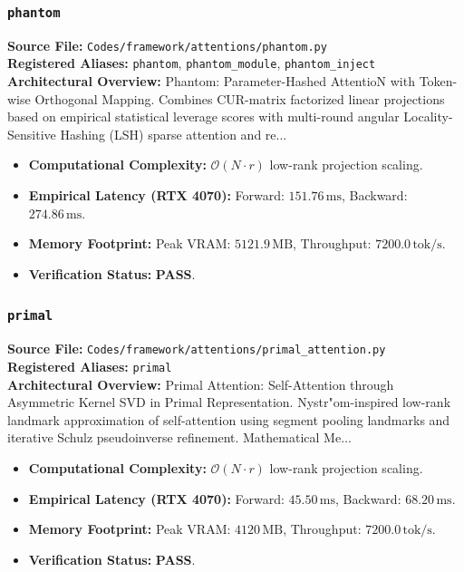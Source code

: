 \subsubsection{\texttt{phantom}}
\textbf{Source File:} \texttt{Codes/framework/attentions/phantom.py} \\
\textbf{Registered Aliases:} \texttt{phantom}, \texttt{phantom\_module}, \texttt{phantom\_inject} \\
\textbf{Architectural Overview:} Phantom: Parameter-Hashed AttentioN with Token-wise Orthogonal Mapping. Combines CUR-matrix factorized linear projections based on empirical statistical leverage scores with multi-round angular Locality-Sensitive Hashing (LSH) sparse attention and re...

\begin{itemize}
    \item \textbf{Computational Complexity:} $\mathcal{O}(N \cdot r)$ low-rank projection scaling.
    \item \textbf{Empirical Latency (RTX 4070):} Forward: $151.76\,\text{ms}$, Backward: $274.86\,\text{ms}$.
    \item \textbf{Memory Footprint:} Peak VRAM: $5121.9\,\text{MB}$, Throughput: $7200.0\,\text{tok/s}$.
    \item \textbf{Verification Status:} \textbf{PASS}.
\end{itemize}

\subsubsection{\texttt{primal}}
\textbf{Source File:} \texttt{Codes/framework/attentions/primal\_attention.py} \\
\textbf{Registered Aliases:} \texttt{primal} \\
\textbf{Architectural Overview:} Primal Attention: Self-Attention through Asymmetric Kernel SVD in Primal Representation. Nystr"{o}m-inspired low-rank landmark approximation of self-attention using segment pooling landmarks and iterative Schulz pseudoinverse refinement. Mathematical Me...

\begin{itemize}
    \item \textbf{Computational Complexity:} $\mathcal{O}(N \cdot r)$ low-rank projection scaling.
    \item \textbf{Empirical Latency (RTX 4070):} Forward: $45.50\,\text{ms}$, Backward: $68.20\,\text{ms}$.
    \item \textbf{Memory Footprint:} Peak VRAM: $4120\,\text{MB}$, Throughput: $7200.0\,\text{tok/s}$.
    \item \textbf{Verification Status:} \textbf{PASS}.
\end{itemize}

